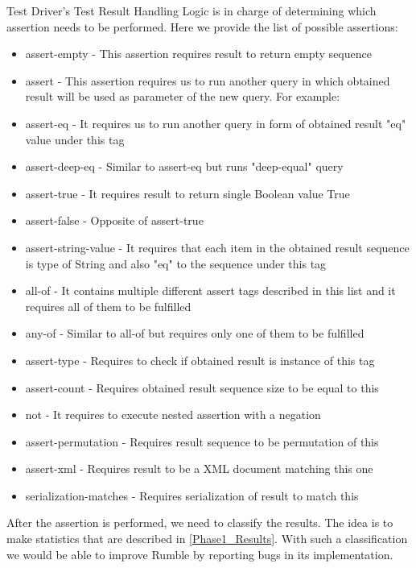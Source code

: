 Test Driver's Test Result Handling Logic is in charge of determining which assertion needs to be performed. Here we provide the list of possible assertions:

\begin{itemize}
	\item assert-empty - This assertion requires result to return empty sequence
	\item assert - This assertion requires us to run another query in which obtained result will be used as parameter of the new query. For example:
	
	\item assert-eq - It requires us to run another query in form of obtained result "eq" value under this tag
	\item assert-deep-eq - Similar to assert-eq but runs "deep-equal" query
	\item assert-true - It requires result to return single Boolean value True
	\item assert-false - Opposite of assert-true
	\item assert-string-value - It requires that each item in the obtained result sequence is type of String and also "eq" to the sequence under this tag
	\item all-of - It contains multiple different assert tags described in this list and it requires all of them to be fulfilled 
	\item any-of - Similar to all-of but requires only one of them to be fulfilled
	\item assert-type - Requires to check if obtained result is instance of this tag
	\item assert-count - Requires obtained result sequence size to be equal to this
	\item not - It requires to execute nested assertion with a negation
	\item assert-permutation - Requires result sequence to be permutation of this
	\item assert-xml - Requires result to be a XML document matching this one
	\item serialization-matches - Requires serialization of result to match this
\end{itemize}

After the assertion is performed, we need to classify the results. The idea is to make statistics that are described in \ref{Phase1_Results}. With such a classification we would be able to improve Rumble by reporting bugs in its implementation.

